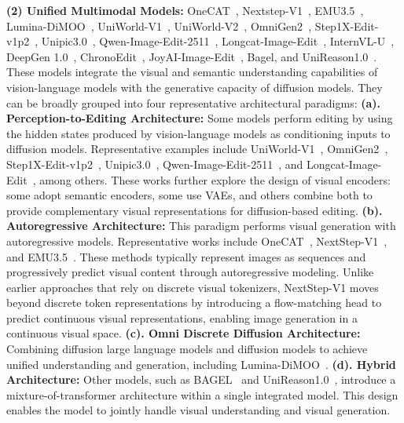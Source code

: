 \documentclass{llmxive}
\begin{document}
\hspace*{1em} \noindent\textbf{(2) Unified Multimodal Models:} OneCAT~\cite{li2025onecat}, 
Nextstep-V1~\cite{han2025nextstep}, EMU3.5~\cite{cui2025emu3}, Lumina-DiMOO~\cite{xin2025lumina}, UniWorld-V1~\cite{lin2025uniworld}, 
UniWorld-V2~\cite{li2025uniworld},
OmniGen2~\cite{wu2025omnigen2}, Step1X-Edit-v1p2~\cite{liu2025step1x}, Unipic3.0~\cite{wei2026skywork}, Qwen-Image-Edit-2511~\cite{wu2025qwen}, Longcat-Image-Edit~\cite{team2025longcat}, InternVL-U~\cite{tian2026internvl}, DeepGen 1.0~\cite{wang2026deepgen}, ChronoEdit~\cite{wu2025chronoedit},  JoyAI-Image-Edit~\cite{joyaiimage2026}, Bagel\cite{deng2025emerging}, and UniReason1.0~\cite{wang2026unireason}. These models integrate the visual and semantic understanding capabilities of vision-language models with the generative capacity of diffusion models. They can be broadly grouped into four representative architectural paradigms: 
\textbf{(a). Perception-to-Editing Architecture: } Some models perform editing by using the hidden states produced by vision-language models as conditioning inputs to diffusion models. Representative examples include UniWorld-V1~\cite{lin2025uniworld}, OmniGen2~\cite{wu2025omnigen2}, Step1X-Edit-v1p2~\cite{liu2025step1x}, Unipic3.0~\cite{wei2026skywork}, Qwen-Image-Edit-2511~\cite{wu2025qwen}, and Longcat-Image-Edit~\cite{team2025longcat}, among others. These works further explore the design of visual encoders: some adopt semantic encoders, some use VAEs, and others combine both to provide complementary visual representations for diffusion-based editing. \textbf{(b). Autoregressive Architecture:} This paradigm performs visual generation with autoregressive models. Representative works include OneCAT~\cite{li2025onecat}, NextStep-V1~\cite{han2025nextstep}, and EMU3.5~\cite{cui2025emu3}. These methods typically represent images as sequences and progressively predict visual content through autoregressive modeling. Unlike earlier approaches that rely on discrete visual tokenizers, NextStep-V1 moves beyond discrete token representations by introducing a flow-matching head to predict continuous visual representations, enabling image generation in a continuous visual space.
\textbf{(c). Omni Discrete Diffusion Architecture:} Combining diffusion large language models and diffusion models to achieve unified understanding and generation, including Lumina-DiMOO~\cite{xin2025lumina}.
\textbf{(d). Hybrid Architecture:} Other models, such as BAGEL~\cite{deng2025emerging} and UniReason1.0~\cite{wang2026unireason}, introduce a mixture-of-transformer architecture within a single integrated model. This design enables the model to jointly handle visual understanding and visual generation.
\end{document}
